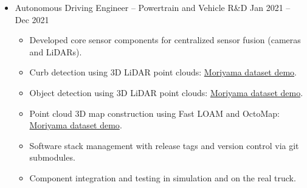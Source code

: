 \documentclass[a4paper,10pt,dvipdfmx]{article}
\begin{document}
\begin{itemize}[noitemsep,nolistsep]
\begin{itemize}
    \end{itemize}
  \item[] Autonomous Driving Engineer -- Powertrain and Vehicle R\&D \hfill Jan 2021 -- Dec 2021
    \begin{itemize}[noitemsep,nolistsep]
      \item Developed core sensor components for centralized sensor fusion (cameras and LiDARs).
      \item Curb detection using 3D LiDAR point clouds: \href{https://youtu.be/ifXtkfOTIvU}{Moriyama dataset demo}.
      \item Object detection using 3D LiDAR point clouds: \href{https://youtu.be/fAb4NLzuoVs}{Moriyama dataset demo}.
      \item Point cloud 3D map construction using Fast LOAM and OctoMap: \href{https://youtu.be/j3xpDWPfBtw}{Moriyama dataset demo}.
      \item Software stack management with release tags and version control via git submodules.
      \item Component integration and testing in simulation and on the real truck.\\
    \end{itemize}
\end{itemize}
\end{document}

